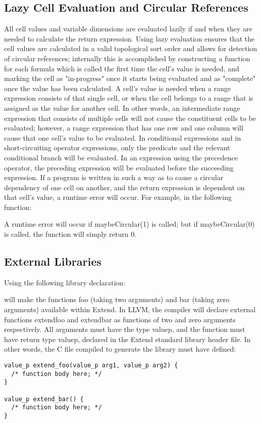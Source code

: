 \subsection{Lazy Cell Evaluation and Circular References}
All cell values and variable dimensions are evaluated lazily if and when they are needed to calculate the return expression. Using lazy evaluation ensures that the cell values are calculated in a valid topological sort order and allows for detection of circular references; internally this is accomplished by constructing a function for each formula which is called the first time the cell's value is needed, and marking the cell as "in-progress" once it starts being evaluated and as "complete" once the value has been calculated. A cell's value is needed when a range expression consists of that single cell, or when the cell belongs to a range that is assigned as the value for another cell. In other words, an intermediate range expression that consists of multiple cells will not cause the constituent cells to be evaluated; however, a range expression that has one row and one column will cause that one cell's value to be evaluated. In conditional expressions and in short-circuiting operator expressions, only the predicate and the relevant conditional branch will be evaluated. In an expression using the precedence operator, the preceding expression will be evaluated before the succeeding expression.
If a program is written in such a way as to cause a circular dependency of one cell on another, and the return expression is dependent on that cell's value, a runtime error will occur. For example, in the following function:

A runtime error will occur if maybeCircular(1) is called; but if maybeCircular(0) is called, the function will simply return 0.
\subsection{External Libraries}
\label{sec:ExternFunctionSignatures}
Using the following library declaration:

will make the functions foo (taking two arguments) and bar (taking zero arguments) available within Extend. In LLVM, the compiler will declare external functions extend\textunderscore foo and extend\textunderscore bar as functions of two and zero arguments respectively. All arguments must have the type value\textunderscore p, and the function must have return type value\textunderscore p, declared in the Extend standard library header file. In other words, the C file compiled to generate the library must have defined:
\begin{lstlisting}
value_p extend_foo(value_p arg1, value_p arg2) {
  /* function body here; */
}

value_p extend_bar() {
  /* function body here; */
}
\end{lstlisting}
